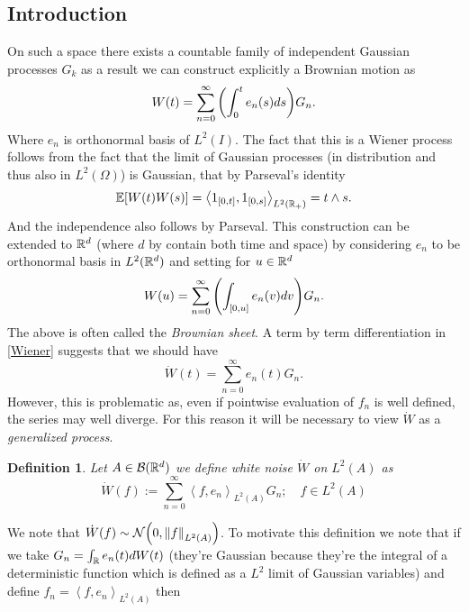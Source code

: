 \documentclass[12pt]{article}
\newtheorem{definition}{Definition}
\newcommand{\br}[1]{\left\langle#1\right\rangle}
\begin{document}
\begin{CJK*}{UTF8}{gbsn}
	\section{Introduction}
	On such a space there exists a countable family of independent Gaussian processes $G_k$ as a result we can construct explicitly a Brownian motion as
	\begin{equation}\label{Wiener}
		W(t)=\sum_{n=0}^{\infty}\qty(\int_{0}^t e_n(s) ds) G_n.
	\end{equation}
	Where $e_n$ is orthonormal basis of  $L^2(I)$.
	The fact that this is a Wiener process follows from the fact that the limit of Gaussian processes (in distribution and thus also in $L^2(\Omega)$) is Gaussian, that by Parseval's identity
	\begin{equation*}
		\E[W(t)W(s)]= \br{1_{[0,t]},1_{[0,s]}}_{L^2(\R_+)}=t \wedge s.
	\end{equation*}
	And the independence also follows by Parseval. This construction can be extended to ${\mathbb R}^d$ (where $d$ by contain both time and space) by considering $e_n$ to be orthonormal basis in  $L^2({\mathbb R}^d)$ and setting for $u\in {\mathbb R}^d$
	\begin{equation*}
		W(u)=\sum_{n=0}^{\infty}\qty(\int_{[0,u]} e_n(v) dv) G_n.
	\end{equation*}
	The above is often called the \emph{Brownian sheet}.
	A term by term differentiation in \eqref{Wiener} suggests that we should have
	\begin{equation*}
		\dot{W}(t)=\sum_{n=0}^{\infty}  e_n(t)G_n.
	\end{equation*}
	However, this is problematic as, even if pointwise evaluation of $f_n$ is well defined, the series may well diverge. For this reason it will be necessary to view  $\dot{W}$ as a \emph{generalized process}.
	\begin{definition}
		Let $A\in \mathcal{B}({\mathbb R}^d)$ we define \emph{white noise} $\dot{W}$ on  $L^2(A)$ as
		\begin{equation*}
			\dot{W}(f):=\sum_{n=0}^{\infty} \br{f,e_n}_{L^2(A)}G_n ;\quad f\in L^2(A)
		\end{equation*}
	\end{definition}
	We note that $\dot{W}(f)\sim \mathcal{N}\qty(0,\norm{f}_{L^2(A)})$.
	To motivate this definition we note that if we take $G_n=\int_{{\mathbb R}}e_n(t) dW(t)$ (they're Gaussian because they're the integral of a deterministic function which is defined as a $L^2$ limit of Gaussian variables) and define $f_n=\br{f,e_n}_{L^2(A)}$ then
	\begin{equation*}

\end{equation*}
\end{CJK*}
\end{document}

